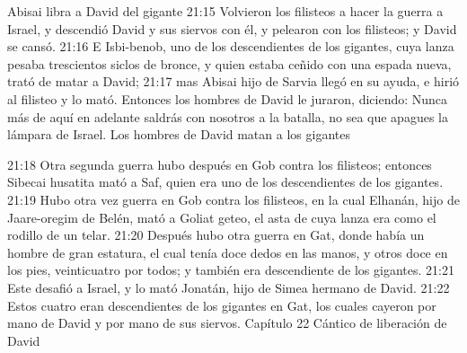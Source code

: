 Abisai libra a David del gigante  
21:15 Volvieron los filisteos a hacer la guerra a Israel, y descendió David y sus siervos con él, y pelearon con los filisteos; y David se cansó.  
21:16 E Isbi-benob, uno de los descendientes de los gigantes, cuya lanza pesaba trescientos siclos de bronce,  y quien estaba ceñido con una espada nueva, trató de matar a David;  
21:17 mas Abisai hijo de Sarvia llegó en su ayuda, e hirió al filisteo y lo mató. Entonces los hombres de David le juraron, diciendo: Nunca más de aquí en adelante saldrás con nosotros a la batalla, no sea que apagues la lámpara de Israel.  
Los hombres de David matan a los gigantes  
 
21:18 Otra segunda guerra hubo después en Gob contra los filisteos; entonces Sibecai husatita mató a Saf, quien era uno de los descendientes de los gigantes.  
21:19 Hubo otra vez guerra en Gob contra los filisteos, en la cual Elhanán, hijo de Jaare-oregim de Belén, mató a Goliat geteo, el asta de cuya lanza era como el rodillo de un telar.  
21:20 Después hubo otra guerra en Gat, donde había un hombre de gran estatura, el cual tenía doce dedos en las manos, y otros doce en los pies, veinticuatro por todos; y también era descendiente de los gigantes.  
21:21 Este desafió a Israel, y lo mató Jonatán, hijo de Simea hermano de David.  
21:22 Estos cuatro eran descendientes de los gigantes en Gat, los cuales cayeron por mano de David y por mano de sus siervos.  
Capítulo 22 
Cántico de liberación de David  
 

